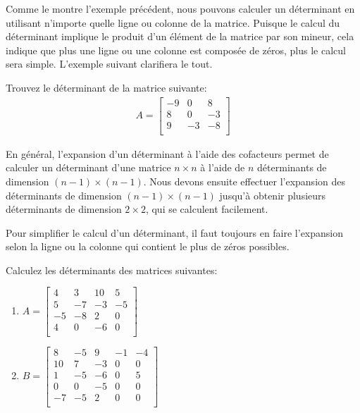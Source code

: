 \documentclass[]{book}
\providecommand{\tightlist}{%
  \setlength{\itemsep}{0pt}\setlength{\parskip}{0pt}}
\theoremstyle{definition}
\theoremstyle{definition}
\theoremstyle{definition}
\theoremstyle{remark}
\let\BeginKnitrBlock\begin \let\EndKnitrBlock\end
\begin{document}
Comme le montre l'exemple précédent, nous pouvons calculer un déterminant en utilisant n'importe quelle ligne ou colonne de la matrice. Puisque le calcul du déterminant implique le produit d'un élément de la matrice par son mineur, cela indique que plus une ligne ou une colonne est composée de zéros, plus le calcul sera simple. L'exemple suivant clarifiera le tout.

\BeginKnitrBlock{example}
\protect\hypertarget{exm:unnamed-chunk-94}{}{\label{exm:unnamed-chunk-94} }Trouvez le déterminant de la matrice suivante:
\begin{align*}
A = \begin{bmatrix}
-9&0&8\\
8&0&-3\\
9&-3&-8\\
\end{bmatrix}
\end{align*}
\EndKnitrBlock{example}

En général, l'expansion d'un déterminant à l'aide des cofacteurs permet de calculer un déterminant d'une matrice \(n\times n\) à l'aide de \(n\) déterminants de dimension \((n-1)\times (n-1)\). Nous devons ensuite effectuer l'expansion des déterminants de dimension \((n-1)\times (n-1)\) jusqu'à obtenir plusieurs déterminants de dimension \(2\times 2\), qui se calculent facilement.

\BeginKnitrBlock{remark}
{}Pour simplifier le calcul d'un déterminant, il faut toujours en faire l'expansion selon la ligne ou la colonne qui contient le plus de zéros possibles.
\EndKnitrBlock{remark}

\BeginKnitrBlock{example}
\protect\hypertarget{exm:unnamed-chunk-96}{}{\label{exm:unnamed-chunk-96} }Calculez les déterminants des matrices suivantes:

\begin{enumerate}
\def\labelenumi{\alph{enumi}.}
\tightlist
\item
  \(A=\begin{bmatrix} 4&3&10&5\\ 5&-7&-3&-5\\ -5&-8&2&0\\ 4&0&-6&0\\ \end{bmatrix}\)
\item
  \(B=\begin{bmatrix} 8&-5&9&-1&-4\\ 10&7&-3&0&0\\ 1&-5&-6&0&5\\ 0&0&-5&0&0\\ -7&-5&2&0&0\\ \end{bmatrix}\)
\end{enumerate}
\EndKnitrBlock{example}
\end{document}
